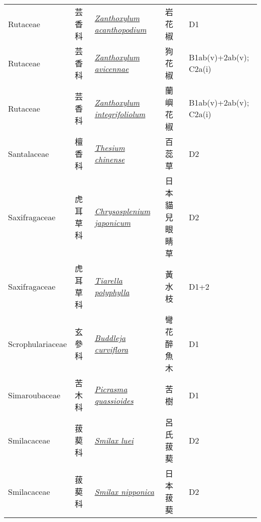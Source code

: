 {\begin{longtable}{p{2.5cm}p{2.5cm}p{4.5cm}p{2.5cm}p{3cm}}
    Rutaceae & 芸香科 & \href{http://www.theplantlist.org/tpl1.1/search?q=Zanthoxylum+acanthopodium}{\textit{Zanthoxylum acanthopodium} } & 岩花椒 & D1 \index{Zanthoxylum@\textit{Zanthoxylum}!acanthopodium@\textit{acanthopodium}}  \index{岩花椒} \\
    Rutaceae & 芸香科 & \href{http://www.theplantlist.org/tpl1.1/search?q=Zanthoxylum+avicennae}{\textit{Zanthoxylum avicennae} } & 狗花椒 & B1ab(v)+2ab(v); C2a(i) \index{Zanthoxylum@\textit{Zanthoxylum}!avicennae@\textit{avicennae}}  \index{狗花椒} \\
    Rutaceae & 芸香科 & \href{http://www.theplantlist.org/tpl1.1/search?q=Zanthoxylum+integrifoliolum}{\textit{Zanthoxylum integrifoliolum} } & 蘭嶼花椒 & B1ab(v)+2ab(v); C2a(i) \index{Zanthoxylum@\textit{Zanthoxylum}!integrifoliolum@\textit{integrifoliolum}}  \index{蘭嶼花椒} \\
    Santalaceae & 檀香科 & \href{http://www.theplantlist.org/tpl1.1/search?q=Thesium+chinense}{\textit{Thesium chinense} } & 百蕊草 & D2 \index{Thesium@\textit{Thesium}!chinense@\textit{chinense}}  \index{百蕊草} \\
    Saxifragaceae & 虎耳草科 & \href{http://www.theplantlist.org/tpl1.1/search?q=Chrysosplenium+japonicum}{\textit{Chrysosplenium japonicum} } & 日本貓兒眼睛草 & D2 \index{Chrysosplenium@\textit{Chrysosplenium}!japonicum@\textit{japonicum}}  \index{日本貓兒眼睛草} \\
    Saxifragaceae & 虎耳草科 & \href{http://www.theplantlist.org/tpl1.1/search?q=Tiarella+polyphylla}{\textit{Tiarella polyphylla} } & 黃水枝 & D1+2 \index{Tiarella@\textit{Tiarella}!polyphylla@\textit{polyphylla}}  \index{黃水枝} \\
    Scrophulariaceae & 玄參科 & \href{http://www.theplantlist.org/tpl1.1/search?q=Buddleja+curviflora}{\textit{Buddleja curviflora} } & 彎花醉魚木 & D1 \index{Buddleja@\textit{Buddleja}!curviflora@\textit{curviflora}}  \index{彎花醉魚木} \\
    Simaroubaceae & 苦木科 & \href{http://www.theplantlist.org/tpl1.1/search?q=Picrasma+quassioides}{\textit{Picrasma quassioides} } & 苦樹 & D1 \index{Picrasma@\textit{Picrasma}!quassioides@\textit{quassioides}}  \index{苦樹} \\
    Smilacaceae & 菝葜科 & \href{http://www.theplantlist.org/tpl1.1/search?q=Smilax+luei}{\textit{Smilax luei} } & 呂氏菝葜 & D2 \index{Smilax@\textit{Smilax}!luei@\textit{luei}}  \index{呂氏菝葜} \\
    Smilacaceae & 菝葜科 & \href{http://www.theplantlist.org/tpl1.1/search?q=Smilax+nipponica}{\textit{Smilax nipponica} } & 日本菝葜 & D2 \index{Smilax@\textit{Smilax}!nipponica@\textit{nipponica}}  \index{日本菝葜} \\

\end{longtable}}
